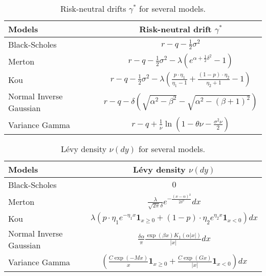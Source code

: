 \begin{table}[!ht]
\centering
  \begin{tabular}{l|c}
    \toprule
    Models & Risk-neutral drift $\gamma^\ast$ \\
    \toprule
   Black-Scholes & $r-q-\frac{1}{2}\sigma^2$ \\
   \midrule
   Merton & $r-q -\frac{1}{2}\sigma^2 - \lambda\left(e^{\alpha+\frac{1}{2}\delta^2}-1\right)$\\
   Kou & $r-q- \frac{1}{2}\sigma^2 -\lambda \left(\frac{p\cdot\eta_1}{\eta_1-1}+\frac{(1-p)\cdot\eta_2}{\eta_2+1}-1\right)$\\
   \midrule
   Normal Inverse Gaussian & $r-q -\delta \left(\sqrt{\alpha^2-\beta^2}-\sqrt{\alpha^2-(\beta+1)^2}\right) $\\
   Variance Gamma &$r-q + \frac{1}{\nu}\ln\left(1-\theta\nu-\frac{\sigma^2\nu}{2}\right)$ \\
    \bottomrule
  \end{tabular}
  \vspace{5pt}
  \caption{\label{tab:rn_drift} Risk-neutral drifts $\gamma^\ast$ for several models.}
\end{table}

\begin{table}[!ht]
\centering
  \begin{tabular}{l|c}
    \toprule
    Models & L\'evy density $\nu(dy)$ \\
    \toprule
   Black-Scholes & $0$ \\
   \midrule
   Merton & $\frac{\lambda}{\sqrt{2\pi}\delta}e^{-\frac{(x-\alpha)^2}{2\delta^2}}dx$\\
   Kou & $\lambda\left(p\cdot\eta_1e^{-\eta_1 x} \mathbf{1}_{x\geq0}+(1-p)\cdot\eta_2e^{\eta_2x}\mathbf{1}_{x<0}\right)dx$\\
   \midrule
   Normal Inverse Gaussian & $\frac{\delta \alpha}{\pi}\frac{\exp(\beta x)K_1(\alpha|x|)}{|x|}dx $\\
   Variance Gamma & $\left(\frac{C\exp(-Mx)}{x}\mathbf{1}_{x\geq0}+\frac{C\exp(Gx)}{|x|}\mathbf{1}_{x<0}\right)dx $ \\
    \bottomrule
  \end{tabular}
  \vspace{5pt}
  \caption{\label{tab:density} L\'evy density $\nu(dy)$ for several models.}
\end{table}

